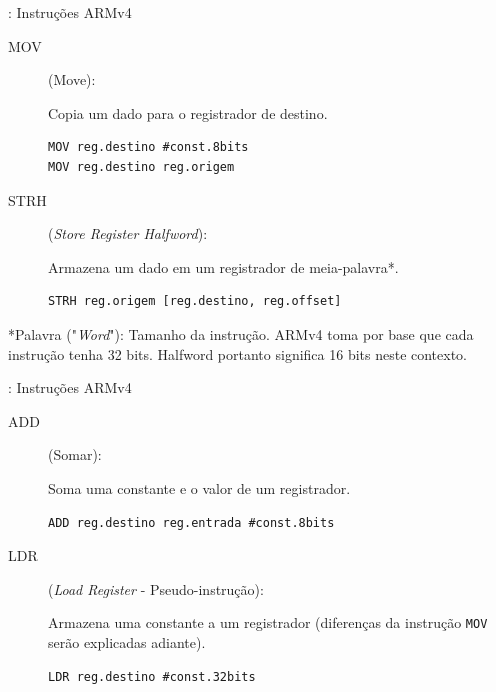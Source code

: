 \documentclass{beamer}
\begin{document}
\begin{darkframes}
\begin{frame}[fragile]{\secname: Instruções ARMv4}
    \begin{description}
        \item[MOV] (Move):

            Copia um dado para o registrador de destino.

            \begin{verbatim}
MOV reg.destino #const.8bits
MOV reg.destino reg.origem
            \end{verbatim}

        \item[STRH] (\textit{Store Register Halfword}):

            Armazena um dado em um registrador de meia-palavra*.

            \begin{verbatim}
STRH reg.origem [reg.destino, reg.offset]
            \end{verbatim}
    \end{description}

    *Palavra ("\textit{Word}"): Tamanho da instrução. ARMv4 toma por base que cada
    instrução tenha 32 bits. Halfword portanto significa 16 bits neste
    contexto.
\end{frame}

\begin{frame}[fragile]{\secname: Instruções ARMv4}
    \begin{description}
        \item[ADD] (Somar):

            Soma uma constante e o valor de um registrador.

            \begin{verbatim}
ADD reg.destino reg.entrada #const.8bits
            \end{verbatim}

        \item[LDR] (\textit{Load Register} - Pseudo-instrução):

            Armazena uma constante a um registrador (diferenças da
            instrução \texttt{MOV} serão explicadas adiante).

            \begin{verbatim}
LDR reg.destino #const.32bits
            \end{verbatim}
    \end{description}
\end{frame}


\end{darkframes}
\end{document}

